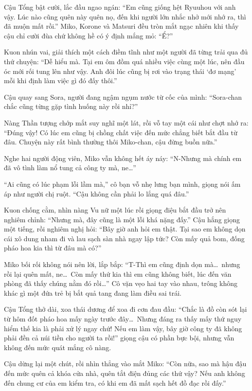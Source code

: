 \documentclass[../main.tex]{subfiles}
\begin{document}
Cậu Tổng bật cười, lắc đầu ngao ngán: ``Em cũng giống hệt Ryuuhou với anh vậy. Lúc nào cũng quên này quên nọ, đến khi người lớn nhắc nhở mới nhớ ra, thì đã muộn mất rồi.'' Miko, Korone và Matsuri đều tròn mắt ngạc nhiên khi thấy cậu chỉ cười đùa chứ không hề có ý định mắng mỏ: ``Ể?''

Kuon nhún vai, giải thích một cách điềm tĩnh như một người đã từng trải qua đủ thứ chuyện: ``Dễ hiểu mà. Tại em ôm đồm quá nhiều việc cùng một lúc, nên đầu óc mới rối tung lên như vậy. Anh đôi lúc cũng bị rơi vào trạng thái `đơ mạng' mỗi khi định làm việc gì đó đấy thôi.''

Cậu quay sang Sora, người đang ngậm ngụm nước từ cốc của mình: ``Sora-chan chắc cũng từng gặp tình huống này rồi nhỉ?''

Nàng Thần tượng chớp mắt suy nghĩ một lát, rồi vỗ tay một cái như chợt nhớ ra: ``Đúng vậy! Có lúc em cũng bị chồng chất việc đến mức chẳng biết bắt đầu từ đâu. Chuyện này rất bình thường thôi Miko-chan, cậu đừng buồn nữa.''

Nghe hai người động viên, Miko vẫn không hết áy náy: ``N-Nhưng mà chính em đã vô tình làm nổ tung cả công ty mà, ne\dots''

``Ai cũng có lúc phạm lỗi lầm mà,'' cô bạn vỗ nhẹ lưng bạn mình, giọng nói ấm áp như người chị ruột. ``Cậu không cần phải lo lắng quá đâu.''

Kuon chống cằm, nhìn nàng Vu nữ một lúc rồi giọng điệu bắt đầu trở nên nghiêm chỉnh: ``Nhưng mà, đây cũng là một lỗi khá nặng đấy.'' Cậu hắng giọng một tiếng, rồi nghiêm nghị hỏi: ``Bây giờ anh hỏi em thật. Tại sao em không dọn cái xô dung nham đi và lau sạch sàn nhà ngay lập tức? Còn mấy quả bom, đống pháo hoa kia thì từ đâu mà có?''

Miko bối rối không nói nên lời, lắp bắp: ``T-Thì em cũng định dọn mà\dots\ nhưng rồi lại quên mất, ne\dots\ Còn mấy thứ kia thì em cũng không biết, lúc đến văn phòng đã thấy chúng nằm đó rồi\dots'' Cô vặn vẹo hai tay vào nhau, trông không khác gì một đứa trẻ bị bắt quả tang đang làm điều sai trái.

Cậu Tổng thở dài, xoa thái dương để xoa đi cơn đau đầu: ``Chắc là đồ còn sót lại từ hôm đốt pháo hoa mấy ngày trước đây\dots\ Nhưng đáng ra thấy mấy thứ nguy hiểm thế kia là phải xử lý ngay chứ! Nếu em làm vậy, bây giờ công ty đã không phải đền cả núi tiền cho người ta rồi!'' giọng cậu có phần bực bội, nhưng vẫn không đến mức quát mắng cô nàng.

Cậu dừng lại một chút, rồi nhìn thẳng vào mắt Miko: ``Còn nữa, sao mà hậu đậu đến mức quên cả khóa cửa nhà, quên tắt điện đủng các thứ vậy? Nếu anh không đến chung cư của em kiểm tra, có khi em đã mất sạch hết đồ đạc rồi đấy.''
\end{document}
